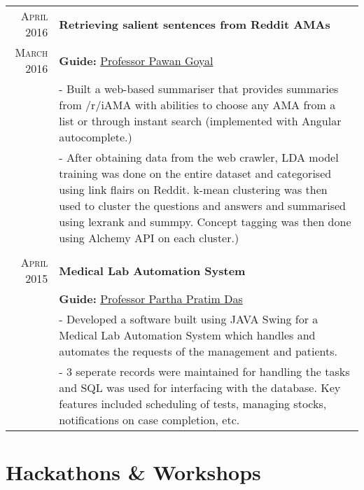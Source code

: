\documentclass[a4paper,10pt]{extarticle} %
\begin{document}
\begin{tabular}{r|p{16cm}}

\textsc{April 2016} & \textbf{Retrieving salient sentences from Reddit AMAs} \\
\textsc{March 2016} & \textbf{Guide: }\textmd{\href{http://cse.iitkgp.ac.in/~pawang/}{Professor Pawan Goyal}}\\
& \footnotesize{- Built a web-based summariser that provides summaries from /r/iAMA with abilities to choose any AMA from a list or through instant search (implemented with Angular autocomplete.)}\\
& \footnotesize{- After obtaining data from the web crawler, LDA model training was done on the entire dataset and categorised using link flairs on Reddit. k-mean clustering was then used to cluster the questions and answers and summarised using lexrank and summpy. Concept tagging was then done using Alchemy API on each cluster.)}\\
\multicolumn{2}{c}{} \\

\textsc{April 2015} & \textbf{Medical Lab Automation System}\\
& \textbf{Guide: }\textmd{\href{http://www.iitkgp.ac.in/fac-profiles/showprofile.php?empcode=SSmUZ}{Professor Partha Pratim Das}}\\
& \footnotesize{- Developed a software built using JAVA Swing for a Medical Lab Automation System which handles and automates the requests of the management and patients.}\\
& \footnotesize{- 3 seperate records were maintained for handling the tasks and SQL was used for interfacing with the database. Key features included scheduling of tests, managing stocks, notifications on case completion, etc.}\\

\end{tabular}

\section{Hackathons \& Workshops}
\end{document}
